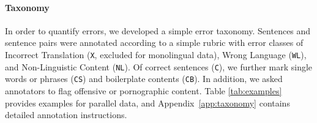 \paragraph{Taxonomy}
In order to quantify errors, we developed a simple error taxonomy. Sentences and sentence pairs were annotated according to a simple rubric with error classes of Incorrect Translation (\texttt{X}, excluded for monolingual data), Wrong Language (\texttt{WL}), and Non-Linguistic Content (\texttt{NL}). Of correct sentences (\texttt{C}), we further mark single words or phrases (\texttt{CS}) and boilerplate contents (\texttt{CB}).
In addition, we asked annotators to flag offensive or pornographic content.
Table \ref{tab:examples} provides examples for parallel data, and Appendix~\ref{app:taxonomy} contains detailed annotation instructions.

\begin{table}[th]
    \centering \small
\end{table}
